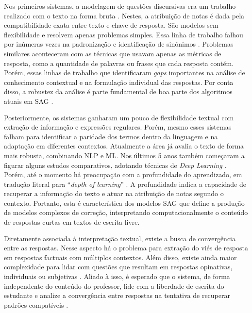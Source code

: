 Nos primeiros sistemas, a modelagem de questões discursivas era um trabalho realizado com o texto na forma bruta \cite{perez-marin2009}. Nestes, a atribuição de notas é dada pela compatibilidade exata entre texto e chave de resposta. São modelos sem flexibilidade e resolvem apenas problemas simples. Essa linha de trabalho falhou por inúmeras vezes na padronização e identificação de sinônimos \cite{leffa2003}. Problemas similares aconteceram com as técnicas que usavam apenas as métricas de resposta, como a quantidade de palavras ou frases que cada resposta contém. Porém, essas linhas de trabalho que identificaram \textit{gaps} importantes na análise de conhecimento contextual e na formulação individual das respostas. Por conta disso, a robustez da análise é parte fundamental de boa parte dos algoritmos atuais em SAG \cite{filighera2020}.

Posteriormente, os sistemas ganharam um pouco de flexibilidade textual com extração de informação e expressões regulares. Porém, mesmo esses sistemas falham para identificar a paridade dos termos dentro da linguagem e na adaptação em diferentes contextos. Atualmente a área já avalia o texto de forma mais robusta, combinando NLP e ML. Nos últimos 5 anos também começaram a figurar alguns estudos comparativos, adotando técnicas de \textit{Deep Learning} \cite{bonthu2021}. Porém, até o momento há preocupação com a profundidade do aprendizado, em tradução literal para ``\textit{depth of learning}'' \cite{burrows2015}. A profundidade indica a capacidade de recuperar a informação do texto e atuar na atribuição de notas segundo o contexto. Portanto, esta é característica dos modelos SAG que define a produção de modelos complexos de correção, interpretando computacionalmente o conteúdo de respostas curtas em textos de escrita livre.

Diretamente associada à interpretação textual, existe a busca de convergência entre as respostas. Nesse aspecto há o problema para extração do viés de resposta em respostas factuais com múltiplos contextos. Além disso, existe ainda maior complexidade para lidar com questões que resultam em respostas opinativas, individuais ou subjetivas \cite{bailey2008}. Aliado à isso, é esperado que o sistema, de forma independente do conteúdo do professor, lide com a liberdade de escrita do estudante e analize a convergência entre respostas na tentativa de recuperar padrões compatíveis \cite{saha2018, lui2022}.

